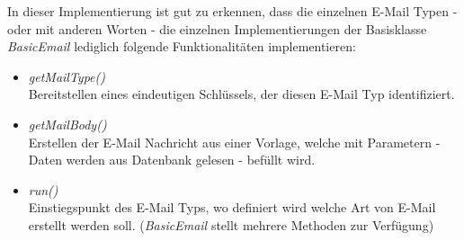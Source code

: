 \newpage
In dieser Implementierung ist gut zu erkennen, dass die einzelnen E-Mail Typen - oder mit anderen Worten - die einzelnen Implementierungen der Basisklasse \emph{BasicEmail} lediglich folgende Funktionalitäten implementieren:
\begin{itemize}
	\item\emph{getMailType()}\\
	Bereitstellen eines eindeutigen Schlüssels, der diesen E-Mail Typ identifiziert.
	\item\emph{getMailBody()}\\
	Erstellen der E-Mail Nachricht aus einer Vorlage, welche mit Parametern - Daten werden aus Datenbank gelesen - befüllt wird.
	\item\emph{run()\\}
	Einstiegspunkt des E-Mail Typs, wo definiert wird welche Art von E-Mail erstellt werden soll. (\emph{BasicEmail} stellt mehrere Methoden zur Verfügung)
\end{itemize}
\ \\

